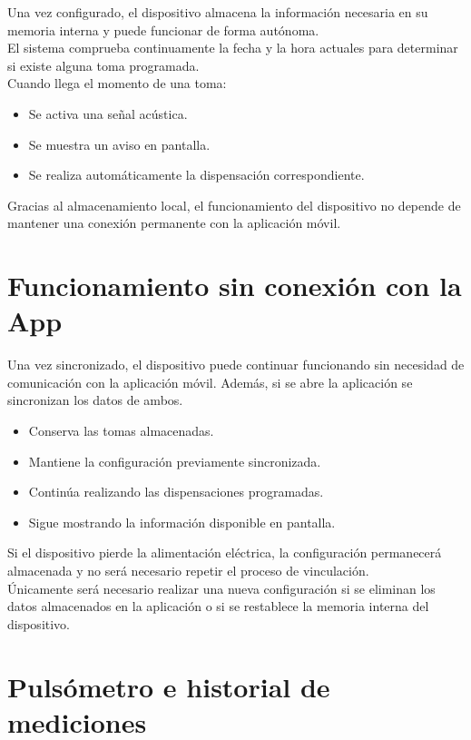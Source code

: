 Una vez configurado, el dispositivo almacena la información necesaria en su memoria interna y puede funcionar de forma autónoma.\\

El sistema comprueba continuamente la fecha y la hora actuales para determinar si existe alguna toma programada.\\

Cuando llega el momento de una toma:

\begin{itemize}
\item Se activa una señal acústica.
\item Se muestra un aviso en pantalla.
\item Se realiza automáticamente la dispensación correspondiente.
\end{itemize}

Gracias al almacenamiento local, el funcionamiento del dispositivo no depende de mantener una conexión permanente con la aplicación móvil.

\section{Funcionamiento sin conexión con la App}

Una vez sincronizado, el dispositivo puede continuar funcionando sin necesidad de comunicación con la aplicación móvil. Además, si se abre la aplicación se sincronizan los datos de ambos.

\begin{itemize}
\item Conserva las tomas almacenadas.
\item Mantiene la configuración previamente sincronizada.
\item Continúa realizando las dispensaciones programadas.
\item Sigue mostrando la información disponible en pantalla.
\end{itemize}

Si el dispositivo pierde la alimentación eléctrica, la configuración permanecerá almacenada y no será necesario repetir el proceso de vinculación.\\

Únicamente será necesario realizar una nueva configuración si se eliminan los datos almacenados en la aplicación o si se restablece la memoria interna del dispositivo.

\section{Pulsómetro e historial de mediciones}

